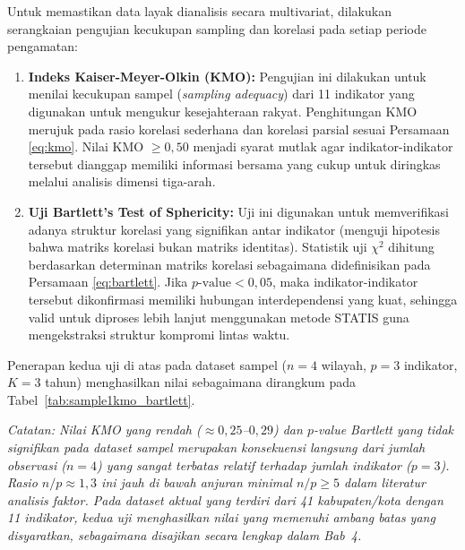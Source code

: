 Untuk memastikan data layak dianalisis secara multivariat, dilakukan serangkaian pengujian kecukupan sampling dan korelasi pada setiap periode pengamatan:
\begin{enumerate}
    \item \textbf{Indeks Kaiser-Meyer-Olkin (KMO):} Pengujian ini dilakukan untuk menilai kecukupan sampel (\textit{sampling adequacy}) dari 11 indikator yang digunakan untuk mengukur kesejahteraan rakyat. Penghitungan KMO merujuk pada rasio korelasi sederhana dan korelasi parsial sesuai Persamaan \ref{eq:kmo}. Nilai KMO $\geq 0,50$ menjadi syarat mutlak agar indikator-indikator tersebut dianggap memiliki informasi bersama yang cukup untuk diringkas melalui analisis dimensi tiga-arah.
    
    \item \textbf{Uji Bartlett's Test of Sphericity:} Uji ini digunakan untuk memverifikasi adanya struktur korelasi yang signifikan antar indikator (menguji hipotesis bahwa matriks korelasi bukan matriks identitas). Statistik uji $\chi^2$ dihitung berdasarkan determinan matriks korelasi sebagaimana didefinisikan pada Persamaan \ref{eq:bartlett}. Jika $p\text{-value} < 0,05$, maka indikator-indikator tersebut dikonfirmasi memiliki hubungan interdependensi yang kuat, sehingga valid untuk diproses lebih lanjut menggunakan metode STATIS guna mengekstraksi struktur kompromi lintas waktu.
\end{enumerate}

Penerapan kedua uji di atas pada dataset sampel ($n=4$ wilayah, $p=3$ indikator, $K=3$ tahun) menghasilkan nilai sebagaimana dirangkum pada Tabel~\ref{tab:sample1kmo_bartlett}.



\vspace{2mm}
\noindent\textit{Catatan: Nilai KMO yang rendah ($\approx 0{,}25$--$0{,}29$) dan $p$-value Bartlett yang tidak signifikan pada dataset sampel merupakan konsekuensi langsung dari jumlah observasi ($n=4$) yang sangat terbatas relatif terhadap jumlah indikator ($p=3$). Rasio $n/p \approx 1{,}3$ ini jauh di bawah anjuran minimal $n/p \geq 5$ dalam literatur analisis faktor. Pada dataset aktual yang terdiri dari 41 kabupaten/kota dengan 11 indikator, kedua uji menghasilkan nilai yang memenuhi ambang batas yang disyaratkan, sebagaimana disajikan secara lengkap dalam Bab~4.}

